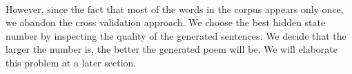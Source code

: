 \paragraph{}
However, since the fact that most of the words in the corpus appears only once, we abandon the cross validation approach. We choose the best hidden state number by inspecting the quality of the generated sentences. We decide that the larger the number is, the better the generated poem will be. We will elaborate this problem at a later section. 
